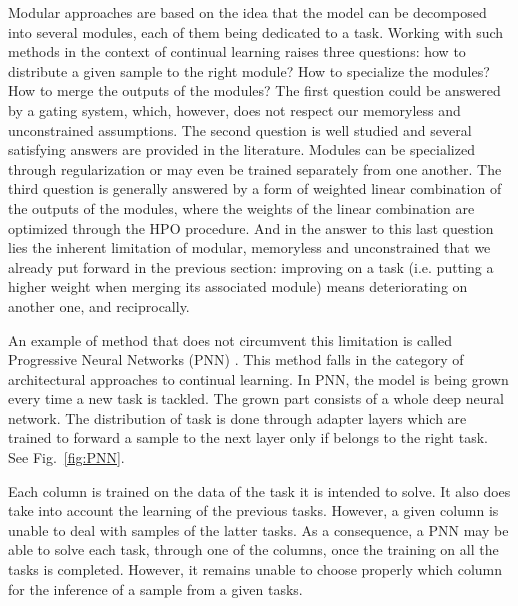\documentclass[11pt]{article}
\begin{document}
\vspace{2mm}
\noindent
Modular approaches are based on the idea that the model can be decomposed into several modules, each of them being dedicated to a task. Working with such methods in the context of continual learning raises three questions: how to distribute a given sample to the right module? How to specialize the modules? How to merge the outputs of the modules? 
The first question could be answered by a gating system, which, however, does not respect our memoryless and unconstrained assumptions. The second question is well studied and several satisfying answers are provided in the literature. Modules can be specialized through regularization or may even be trained separately from one another. The third question is generally answered by a form of weighted linear combination of the outputs of the modules, where the weights of the linear combination are optimized through the HPO procedure. And in the answer to this last question lies the inherent limitation of modular, memoryless and unconstrained that we already put forward in the previous section: improving on a task (i.e. putting a higher weight when merging its associated module) means deteriorating on another one, and reciprocally. 

\vspace{2mm}
\noindent
An example of method that does not circumvent this limitation is called Progressive Neural Networks (PNN) \cite{PNN}. This method falls in the category of architectural approaches to continual learning. In PNN, the model is being grown every time a new task is tackled. The grown part consists of a whole deep neural network. The distribution of task is done through adapter layers which are trained to forward a sample to the next layer only if belongs to the right task. See Fig.~\ref{fig:PNN}.

\vspace{2mm}
\noindent
Each column is trained on the data of the task it is intended to solve. It also does take into account the learning of the previous tasks. However, a given column is unable to deal with samples of the latter tasks. As a consequence, a PNN may be able to solve each task, through one of the columns, once the training on all the tasks is completed. However, it remains unable to choose properly which column for the inference of a sample from a given tasks. 
\end{document}
